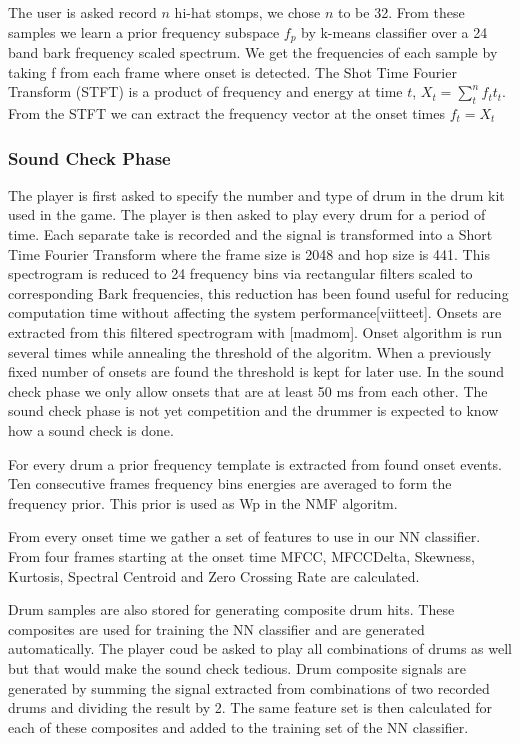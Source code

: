 \documentclass[10pt]{article}
\begin{document}
The user is asked record $n$ hi-hat stomps, we chose $n$ to be 32. From these samples we learn a prior frequency subspace $f_{p}$ by k-means \iffalse K* Mikä tämä on??\fi classifier over a 24 band bark frequency scaled spectrum. We get the frequencies of each sample by taking f from each frame where onset is detected. The Shot Time Fourier Transform (STFT) is a product of frequency and energy at time $t$, $X_t= \sum_{t} ^{n}f_t{t_t}$. From the STFT we can extract the frequency vector at the onset times $f_t=X_t$

\subsubsection{Sound Check Phase}

The player is first asked to specify the number and type of drum in the drum kit used in the game.
The player is  then asked to play every drum for a period of time. Each separate take is recorded and the signal is transformed into a Short Time Fourier Transform where the frame size is 2048 and hop size is 441. This spectrogram is reduced to 24 frequency bins via rectangular filters scaled to corresponding Bark frequencies, this reduction has been found useful for reducing computation time without affecting the system performance[viitteet]. Onsets are extracted from this filtered spectrogram with [madmom]. Onset algorithm is run several times while annealing the threshold of the algoritm. When a previously fixed number of onsets are found the threshold is kept for later use. In the sound check phase we only allow onsets that are at least 50 ms from each other. The sound check phase is not yet competition and the drummer is expected to know how a sound check is done. 

For every drum a prior frequency template is extracted from found onset events. Ten consecutive frames frequency bins energies are averaged to form the frequency prior. This prior is used as Wp in the NMF algoritm.

From every onset time we gather a set of features to use in our NN classifier. From four frames starting at the onset time MFCC, MFCCDelta, Skewness, Kurtosis, Spectral Centroid and Zero Crossing Rate are calculated. 

Drum samples are also stored for generating composite drum hits. These composites are used for training the NN classifier and are generated automatically. The player coud be asked to play all combinations of drums as well but that would make the sound check tedious.
Drum composite signals are generated by summing the signal extracted from combinations of two recorded drums and dividing the result by 2. The same feature set is then calculated for each of these composites and added to the training set of the NN classifier.
\end{document}
